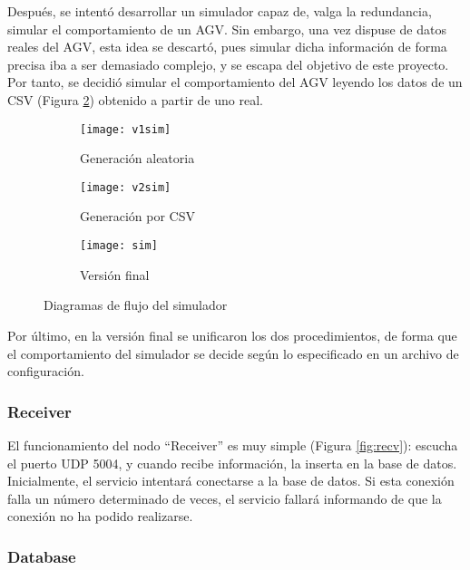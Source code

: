 Después, se intentó desarrollar un simulador capaz de, valga la redundancia, simular el comportamiento de un AGV. Sin
embargo, una vez dispuse de datos reales del AGV, esta idea se descartó, pues simular dicha información de forma
precisa iba a ser demasiado complejo, y se escapa del objetivo de este proyecto. Por tanto, se decidió simular el
comportamiento del AGV leyendo los datos de un CSV (Figura \ref{fig:v2sim}) obtenido a partir de uno real.

\begin{figure}
    \centering
    \begin{subfigure}[b]{0.45\textwidth}
        \centering
        \texttt{[image: v1sim]}
        \caption{Generación aleatoria}
        \label{fig:v1sim}
    \end{subfigure}
    \hfill
    \begin{subfigure}[b]{0.45\textwidth}
        \centering
        \texttt{[image: v2sim]}
        \caption{Generación por CSV}
        \label{fig:v2sim}
    \end{subfigure}
    \begin{subfigure}[b]{0.7\textwidth}
        \centering
        \texttt{[image: sim]}
        \caption{Versión final}
        \label{fig:sim}
    \end{subfigure}
    \caption{Diagramas de flujo del simulador}
    \label{fig:diagsim}
\end{figure}

Por último, en la versión final se unificaron los dos procedimientos, de forma que el comportamiento del simulador
se decide según lo especificado en un archivo de configuración.

\subsubsection{Receiver}

El funcionamiento del nodo ``Receiver'' es muy simple (Figura \ref{fig:recv}): escucha el puerto UDP 5004, y cuando recibe información, la inserta 
en la base de datos. Inicialmente, el servicio intentará conectarse a la base de datos. Si esta conexión falla un número
determinado de veces, el servicio fallará informando de que la conexión no ha podido realizarse.


\subsubsection{Database}

